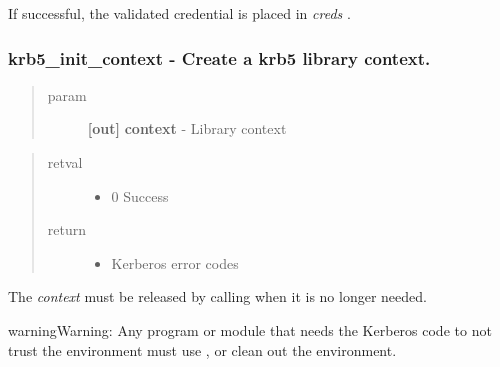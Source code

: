\documentclass[letterpaper,10pt,english]{sphinxmanual}
\begin{document}
If successful, the validated credential is placed in \emph{creds} .


\subsubsection{krb5\_init\_context -  Create a krb5 library context.}
\label{appdev/refs/api/krb5_init_context:krb5-init-context-create-a-krb5-library-context}\label{appdev/refs/api/krb5_init_context::doc}

\begin{fulllineitems}
\label{appdev/refs/api/krb5_init_context:krb5_init_context}
\end{fulllineitems}

\begin{quote}\begin{description}
\item[{param}] \leavevmode
\textbf{{[}out{]}} \textbf{context} - Library context

\end{description}\end{quote}
\begin{quote}\begin{description}
\item[{retval}] \leavevmode\begin{itemize}
\item {} 
0   Success

\end{itemize}

\item[{return}] \leavevmode\begin{itemize}
\item {} 
Kerberos error codes

\end{itemize}

\end{description}\end{quote}

The \emph{context} must be released by calling {\hyperref[appdev/refs/api/krb5_free_context:krb5_free_context]{}} when it is no longer needed.

\begin{notice}{warning}{Warning:}
Any program or module that needs the Kerberos code to not trust the environment must use {\hyperref[appdev/refs/api/krb5_init_secure_context:krb5_init_secure_context]{}} , or clean out the environment.
\end{notice}
\end{document}
